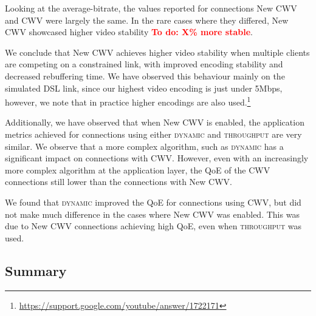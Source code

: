 \documentclass[10pt,sigconf]{acmart}
\newcommand{\todo}[1]{\textbf{\textcolor{red}{To do: #1}}}
\begin{document}
Looking at the average-bitrate, the values reported for connections New CWV and CWV were largely the same. In the rare cases where they differed, New CWV showcased higher video stability \todo{X\% more stable}.


We conclude that New CWV achieves higher video stability when multiple clients are competing on a constrained link, with improved encoding stability and decreased rebuffering time. We have observed this behaviour mainly on the simulated DSL link, since our highest video encoding is just under 5Mbps, however, we note that in practice higher encodings are also used.\footnote{\url{https://support.google.com/youtube/answer/1722171}}

Additionally, we have observed that when New CWV is enabled, the application metrics achieved for connections using either \textsc{dynamic} and \textsc{throughput} are very similar. We observe that a more complex algorithm, such as \textsc{dynamic} has a significant impact on connections with CWV. However, even with an increasingly more complex algorithm at the application layer, the QoE of the CWV connections still lower than the connections with New CWV.

We found that \textsc{dynamic} improved the QoE for connections using CWV, but did not make much difference in the cases where New CWV was enabled. This was due to New CWV connections achieving high QoE, even when \textsc{throughput} was used.

\subsection{Summary}
\label{sec:summary}

\end{document}
